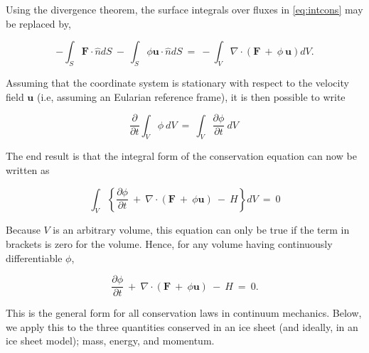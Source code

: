 Using the divergence theorem, the surface integrals over fluxes in \eqref{eq:intcons} may be replaced by,

\begin{equation}
-{ \int }_{ S} {\mathbf F} {\cdot} \hat{n}dS~ - ~{ \int }_{ S} \phi {\mathbf u}
    {\cdot}\hat{n} dS~ = ~ -{ \int }_{ V} \nabla {\cdot} \left ( {
    {\mathbf F}~ + ~ \phi ~ {\mathbf u}} \right )dV.
\end{equation}

Assuming that the coordinate system is stationary with respect to the velocity field $\mathbf{u}$ 
(i.e, assuming an Eularian reference frame), it is then possible to write

\begin{equation}
{\frac{ \partial}{ \partial t}} { \int }_{ V} \phi ~dV~ = ~{ \int }_{ V}
    {\frac{ \partial \phi }{ \partial t}} ~dV~
\end{equation}

The end result is that the integral form of the conservation equation can now be written as

\begin{equation}
{ \int }_{ V} \left\{ {{\frac{ \partial \phi }{ \partial t}}
    ~ + ~ \nabla {\cdot} \left ( { {\mathbf F}~ + ~ \phi {\mathbf u}} \right ) ~
    - ~ H} \right\} dV~ = ~ 0
\end{equation}

Because $V$ is an arbitrary volume, this equation can only be true if the term in brackets is zero 
for the volume. Hence, for any volume having continuously differentiable $\phi$,

\begin{equation}
{\frac{ \partial \phi }{ \partial t}} ~ + ~ \nabla {\cdot} 
    \left ( { {\mathbf F}~ + ~ \phi {\mathbf u}} \right ) ~ - ~H~ = ~ 0.
    \label{eq:derivcons}
\end{equation}

This is the general form for all conservation laws in continuum mechanics. Below, we apply this to the three quantities conserved in an 
ice sheet (and ideally, in an ice sheet model); mass, energy, and momentum.



